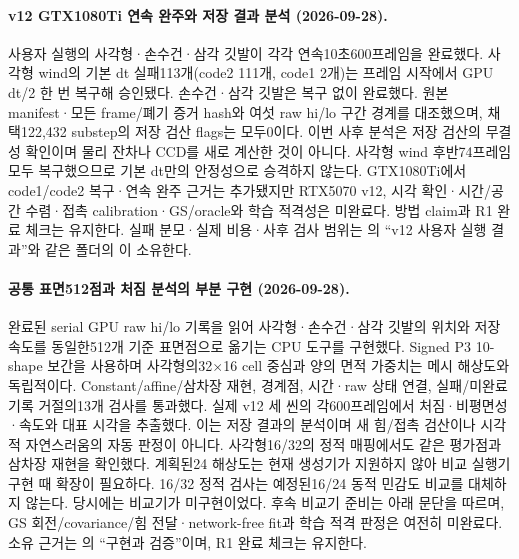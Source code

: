 \documentclass[10pt]{article}
\begin{document}
\paragraph{v12 GTX1080Ti 연속 완주와 저장 결과 분석 (2026-09-28).}
\label{sec:r1-v12-completion}
사용자 실행의 사각형·손수건·삼각 깃발이 각각 연속10초600프레임을 완료했다.
사각형 wind의 기본 dt 실패113개(code2 111개, code1 2개)는 프레임 시작에서
GPU dt/2 한 번 복구해 승인됐다. 손수건·삼각 깃발은 복구 없이 완료했다.
원본 manifest·모든 frame/폐기 증거 hash와 여섯 raw hi/lo 구간 경계를 대조했으며,
채택122,432 substep의 저장 검산 flags는 모두0이다. 이번 사후 분석은 저장 검산의
무결성 확인이며 물리 잔차나 CCD를 새로 계산한 것이 아니다.
사각형 wind 후반74프레임 모두 복구했으므로 기본 dt만의 안정성으로 승격하지 않는다.
GTX1080Ti에서 code1/code2 복구·연속 완주 근거는 추가됐지만 RTX5070 v12,
시각 확인·시간/공간 수렴·접촉 calibration·GS/oracle와 학습 적격성은 미완료다.
방법 claim과 R1 완료 체크는 유지한다. 실패 분모·실제 비용·사후 검사 범위는
의
``v12 사용자 실행 결과''와 같은 폴더의 이 소유한다.

\paragraph{공통 표면512점과 처짐 분석의 부분 구현 (2026-09-28).}
\label{sec:r1-common-motion-analysis}
완료된 serial GPU raw hi/lo 기록을 읽어 사각형·손수건·삼각 깃발의 위치와 저장 속도를
동일한512개 기준 표면점으로 옮기는 CPU 도구를 구현했다. Signed P3 10-shape 보간을
사용하며 사각형의32$\times$16 cell 중심과 양의 면적 가중치는 메시 해상도와 독립적이다.
Constant/affine/삼차장 재현, 경계점, 시간·raw 상태 연결, 실패/미완료 기록 거절의13개 검사를
통과했다. 실제 v12 세 씬의 각600프레임에서 처짐·비평면성·속도와 대표 시각을 추출했다.
이는 저장 결과의 분석이며 새 힘/접촉 검산이나 시각적 자연스러움의 자동 판정이 아니다.
사각형16/32의 정적 매핑에서도 같은 평가점과 삼차장 재현을 확인했다.
계획된24 해상도는 현재 생성기가 지원하지 않아 비교 실행기 구현 때 확장이 필요하다.
16/32 정적 검사는 예정된16/24 동적 민감도 비교를 대체하지 않는다.
당시에는 비교기가 미구현이었다. 후속 비교기 준비는 아래 문단을 따르며,
GS 회전/covariance/힘 전달·network-free fit과 학습 적격 판정은 여전히 미완료다.
소유 근거는 의
 ``구현과 검증''이며, R1 완료 체크는 유지한다.
\end{document}
